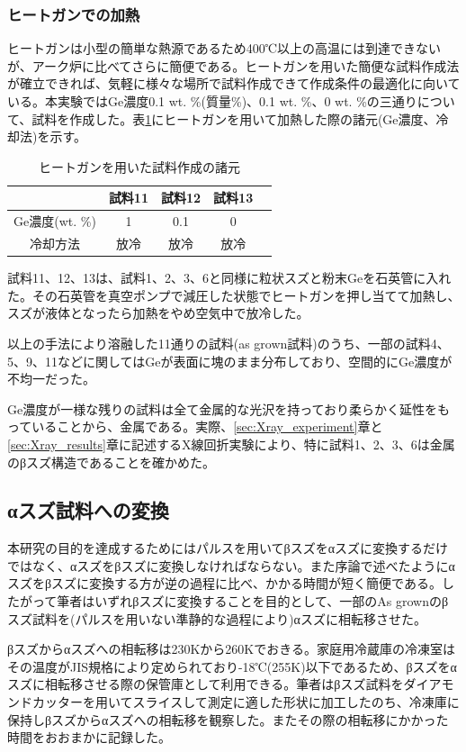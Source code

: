 \subsubsection{ヒートガンでの加熱}
ヒートガンは小型の簡単な熱源であるため400℃以上の高温には到達できないが、アーク炉に比べてさらに簡便である。ヒートガンを用いた簡便な試料作成法が確立できれば、気軽に様々な場所で試料作成できて作成条件の最適化に向いている。本実験ではGe濃度0.1 wt. \%(質量\%)、0.1 wt. \%、0 wt. \%の三通りについて、試料を作成した。表\ref{tab:sample_prep_heatgun}にヒートガンを用いて加熱した際の諸元(Ge濃度、冷却法)を示す。
\begin{table}[!h]
    \begin{center}
  \begin{tabular}{c|cccc}
    & 試料11 & 試料12 & 試料13 \\ \hline
    Ge濃度(wt. \%)  & 1 & 0.1 &  0  \\
    冷却方法 & 放冷 & 放冷 & 放冷 \\
  \end{tabular}
  \caption{ヒートガンを用いた試料作成の諸元}
  \label{tab:sample_prep_heatgun}
    \end{center}
\end{table}

試料11、12、13は、試料1、2、3、6と同様に粒状スズと粉末Geを石英管に入れた。その石英管を真空ポンプで減圧した状態でヒートガンを押し当てて加熱し、スズが液体となったら加熱をやめ空気中で放冷した。

以上の手法により溶融した11通りの試料(as grown試料)のうち、一部の試料4、5、9、11などに関してはGeが表面に塊のまま分布しており、空間的にGe濃度が不均一だった。

Ge濃度が一様な残りの試料は全て金属的な光沢を持っており柔らかく延性をもっていることから、金属である。実際、\ref{sec:Xray_experiment}章と\ref{sec:Xray_results}章に記述するX線回折実験により、特に試料1、2、3、6は金属のβスズ構造であることを確かめた。

\subsection{αスズ試料への変換}
本研究の目的を達成するためにはパルスを用いてβスズをαスズに変換するだけではなく、αスズをβスズに変換しなければならない。また序論で述べたようにαスズをβスズに変換する方が逆の過程に比べ、かかる時間が短く簡便である。したがって筆者はいずれβスズに変換することを目的として、一部のAs grownのβスズ試料を(パルスを用いない準静的な過程により)αスズに相転移させた。

βスズからαスズへの相転移は230Kから260Kでおきる\cite{Matvienko,Ogino,Cornelius}。家庭用冷蔵庫の冷凍室はその温度がJIS規格により定められており-18℃(255K)以下であるため、βスズをαスズに相転移させる際の保管庫として利用できる。筆者はβスズ試料をダイアモンドカッターを用いてスライスして測定に適した形状に加工したのち、冷凍庫に保持しβスズからαスズへの相転移を観察した。またその際の相転移にかかった時間をおおまかに記録した。

